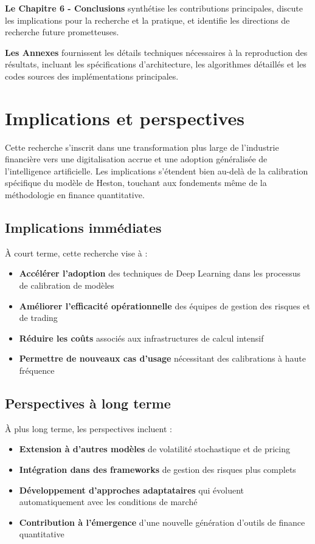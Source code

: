 \textbf{Le Chapitre 6 - Conclusions} synthétise les contributions principales, discute les implications pour la recherche et la pratique, et identifie les directions de recherche future prometteuses.

\textbf{Les Annexes} fournissent les détails techniques nécessaires à la reproduction des résultats, incluant les spécifications d'architecture, les algorithmes détaillés et les codes sources des implémentations principales.

\section{Implications et perspectives}

Cette recherche s'inscrit dans une transformation plus large de l'industrie financière vers une digitalisation accrue et une adoption généralisée de l'intelligence artificielle. Les implications s'étendent bien au-delà de la calibration spécifique du modèle de Heston, touchant aux fondements même de la méthodologie en finance quantitative.

\subsection{Implications immédiates}

À court terme, cette recherche vise à :

\begin{itemize}
\item \textbf{Accélérer l'adoption} des techniques de Deep Learning dans les processus de calibration de modèles
\item \textbf{Améliorer l'efficacité opérationnelle} des équipes de gestion des risques et de trading
\item \textbf{Réduire les coûts} associés aux infrastructures de calcul intensif
\item \textbf{Permettre de nouveaux cas d'usage} nécessitant des calibrations à haute fréquence
\end{itemize}

\subsection{Perspectives à long terme}

À plus long terme, les perspectives incluent :

\begin{itemize}
\item \textbf{Extension à d'autres modèles} de volatilité stochastique et de pricing
\item \textbf{Intégration dans des frameworks} de gestion des risques plus complets
\item \textbf{Développement d'approches adaptataires} qui évoluent automatiquement avec les conditions de marché
\item \textbf{Contribution à l'émergence} d'une nouvelle génération d'outils de finance quantitative
\end{itemize}

